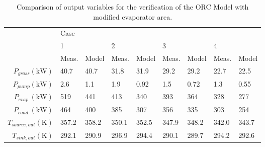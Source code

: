 \begin{table}%
	\centering
	\caption{Comparison of output variables for the verification of the ORC Model with modified evaporator area.}
	\label{tab:verification_results02}
	\begin{tabular}{rllllllll}
		\toprule
		                                           & Case  &       &       &       &       &       &       &       \\ \cline{2-9}
		                                           & 1     &       & 2     &       & 3     &       & 4     &       \\
		                                           & Meas. & Model & Meas. & Model & Meas. & Model & Meas. & Model \\ \midrule
		              $P_{gross}(\si{\kilo\watt})$ & 40.7  & 40.7  & 31.8  & 31.9  & 29.2  & 29.2  & 22.7  & 22.5  \\
		               $P_{pump}(\si{\kilo\watt})$ & 2.6   & 1.1   & 1.9   & 0.92  & 1.5   & 0.72  & 1.3   & 0.55  \\
		              $P_{evap.}(\si{\kilo\watt})$ & 519   & 441   & 413   & 340   & 393   & 364   & 328   & 277   \\
		              $P_{cond.}(\si{\kilo\watt})$ & 464   & 400   & 385   & 307   & 356   & 335   & 303   & 254   \\
		            $T_{source,out}(\si{\kelvin})$ & 357.2 & 358.2 & 350.1 & 352.5 & 347.9 & 348.2 & 342.0 & 343.7 \\
		              $T_{sink,out}(\si{\kelvin})$ & 292.1 & 290.9 & 296.9 & 294.4 & 290.1 & 289.7 & 294.2 & 292.6 \\ \bottomrule
	\end{tabular}
\end{table}

